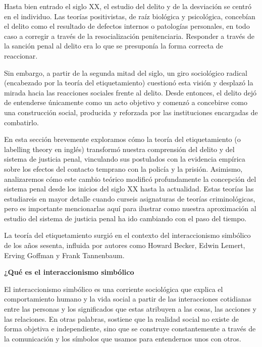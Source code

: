 \documentclass[
  spanish,
  letterpaper,
  DIV=11,
  numbers=noendperiod]{scrreprt}
\begin{document}
Hasta bien entrado el siglo XX, el estudio del delito y de la desviación
se centró en el individuo. Las teorías positivistas, de raíz biológica y
psicológica, concebían el delito como el resultado de defectos internos
o patologías personales, en todo caso a corregir a través de la
resocialización penitenciaria. Responder a través de la sanción penal al
delito era lo que se presuponía la forma correcta de reaccionar.

Sin embargo, a partir de la segunda mitad del siglo, un giro sociológico
radical (encabezado por la teoría del etiquetamiento) cuestionó esta
visión y desplazó la mirada hacia las reacciones sociales frente al
delito. Desde entonces, el delito dejó de entenderse únicamente como un
acto objetivo y comenzó a concebirse como una construcción social,
producida y reforzada por las instituciones encargadas de combatirlo.

En esta sección brevemente exploramos cómo la teoría del etiquetamiento
(o labelling theory en inglés) transformó nuestra comprensión del delito
y del sistema de justicia penal, vinculando sus postulados con la
evidencia empírica sobre los efectos del contacto temprano con la
policía y la prisión. Asimismo, analizaremos cómo este cambio teórico
modificó profundamente la concepción del sistema penal desde los inicios
del siglo XX hasta la actualidad. Estas teorías las estudiareis en mayor
detalle cuando curseis asignaturas de teorías criminológicas, pero es
importante mencionarlas aquí para ilustrar como nuestra aproximación al
estudio del sistema de justicia penal ha ido cambiando con el paso del
tiempo.

La teoría del etiquetamiento surgió en el contexto del interaccionismo
simbólico de los años sesenta, influida por autores como Howard Becker,
Edwin Lemert, Erving Goffman y Frank Tannenbaum.

\begin{tcolorbox}[enhanced jigsaw, bottomtitle=1mm, toprule=.15mm, colbacktitle=quarto-callout-note-color!10!white, bottomrule=.15mm, leftrule=.75mm, colframe=quarto-callout-note-color-frame, opacitybacktitle=0.6, titlerule=0mm, breakable, colback=white, left=2mm, arc=.35mm, title=\textcolor{quarto-callout-note-color}{\faInfo}\hspace{0.5em}{Nota}, toptitle=1mm, coltitle=black, rightrule=.15mm, opacityback=0]

\textbf{¿Qué es el interaccionismo simbólico}

El interaccionismo simbólico es una corriente sociológica que explica el
comportamiento humano y la vida social a partir de las interacciones
cotidianas entre las personas y los significados que estas atribuyen a
las cosas, las acciones y las relaciones. En otras palabras, sostiene
que la realidad social no existe de forma objetiva e independiente, sino
que se construye constantemente a través de la comunicación y los
símbolos que usamos para entendernos unos con otros.

\end{tcolorbox}
\end{document}
